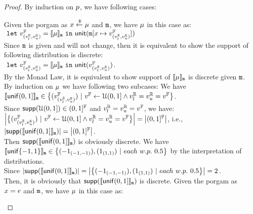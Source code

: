\documentclass[a4paper,11pt]{article}
\begin{document}
\begin{proof}
By induction on $p$, we have following cases:
\begin{itemize}
	\caseL{$\varx \samplel \edistr$}
	Given the porgam as $\varx \samplel \edistr$ and $\mathtt{m}$, 
	we have $\mu$ in this case as:
	\\
	$~\mathtt{let}~ v^{\mathbb{F}}_{(v^{\mathbb{R}}_{l}, v^{\mathbb{R}}_{u})} = \llbracket \mu \rrbracket_{\mathtt{m}}
	~\mathtt{in}~ 
	\mathsf{unit}(\mathtt{m}[x \mapsto v^{\mathbb{F}}_{(v^{\mathbb{R}}_{l}, v^{\mathbb{R}}_{u})}])
	$
	\\
	Since $\mathtt{m}$ is given and will not change, then it is equivalent to show the support of following distribution is discrete:
	\\ 
	$~\mathtt{let}~ v^{\mathbb{F}}_{(v^{\mathbb{R}}_{l}, v^{\mathbb{R}}_{u})} = \llbracket \mu \rrbracket_{\mathtt{m}}
	~\mathtt{in}~ 
	\mathsf{unit}(v^{\mathbb{F}}_{(v^{\mathbb{R}}_{l}, v^{\mathbb{R}}_{u})})$.
	\\
	By the Monad Law, it is equivalent to show support of $\llbracket \mu \rrbracket_{\mathtt{m}}$ is discrete given $\mathtt{m}$.
	\\
	By induction on $\mu$ we have following two subcases:
	\subcaseL{$\uniform(0,1]$}
	We have 
	$\llbracket \mathsf{unif}(0,1] \rrbracket_{\mathtt{m}} \in 
	\big\{
	(v^{\mathbb{F}}_{(v^{\mathbb{R}}_{l}, v^{\mathbb{R}}_{u})}) ~|~
	v^{\mathbb{F}} \leftarrow \mathcal{U}(0, 1]
	\land v^{\mathbb{R}}_{l} = v^{\mathbb{R}}_{u} = v^{\mathbb{F}}
	\big\}$.
	\\
	Since $\mathsf{supp}(\mathcal{U}(0, 1]) \in (0, 1]^{\mathbb{F}}$ and $v^{\mathbb{R}}_{l} = v^{\mathbb{R}}_{u} = v^{\mathbb{F}}$, we have:
	\\ 
	$\left \vert\big\{
		(v^{\mathbb{F}}_{(v^{\mathbb{R}}_{l}, v^{\mathbb{R}}_{u})}) ~|~
		v^{\mathbb{F}} \leftarrow \mathcal{U}(0, 1]
		\land v^{\mathbb{R}}_{l} = v^{\mathbb{R}}_{u} = v^{\mathbb{F}}
		\big\} \right \vert
	= \left \vert (0, 1]^{\mathbb{F}} \right \vert$,
	i.e., $\left \vert \mathsf{supp}(\llbracket \mathsf{unif}(0,1] \rrbracket_{\mathtt{m}}) \right\vert = \left \vert (0, 1]^{\mathbb{F}} \right \vert$.
	\\
	Then $\mathsf{supp}(\llbracket \mathsf{unif}(0,1] \rrbracket_{\mathtt{m}})$ is obviously discrete.
	We have $\llbracket \mathsf{unif}\{-1, 1\} \rrbracket_{\mathtt{m}} \in  
	\big\{
	(-1_{(-1, -1)}), (1_{(1, 1)}) ~|~
	each ~ w.p. ~ 0.5 
	\big\}$ by the interpretation of distributions.
	\\
	Since $\left \vert \mathsf{supp}(\llbracket \mathsf{unif}(0,1] \rrbracket_{\mathtt{m}}) \right\vert = \left \vert \big\{
	(-1_{(-1, -1)}), (1_{(1, 1)}) ~|~
	each ~ w.p. ~ 0.5 
	\big\} \right \vert = 2$.
	\\
	Then, it is obviously that $\mathsf{supp}(\llbracket \mathsf{unif}(0,1] \rrbracket_{\mathtt{m}})$ is discrete.
	\caseL{$\varx = \expr$}
	Given the porgam as $\varx = \expr$ and $\mathtt{m}$, 
	we have $\mu$ in this case as:
	\\

\end{itemize}
\end{proof}
\end{document}
